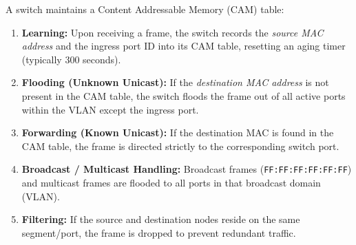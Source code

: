 \begin{keyconcept}
A switch maintains a Content Addressable Memory (CAM) table:
\begin{enumerate}[leftmargin=*]
    \item \textbf{Learning:} Upon receiving a frame, the switch records the \textit{source MAC address} and the ingress port ID into its CAM table, resetting an aging timer (typically 300 seconds).
    \item \textbf{Flooding (Unknown Unicast):} If the \textit{destination MAC address} is not present in the CAM table, the switch floods the frame out of all active ports within the VLAN except the ingress port.
    \item \textbf{Forwarding (Known Unicast):} If the destination MAC is found in the CAM table, the frame is directed strictly to the corresponding switch port.
    \item \textbf{Broadcast / Multicast Handling:} Broadcast frames (\texttt{FF:FF:FF:FF:FF:FF}) and multicast frames are flooded to all ports in that broadcast domain (VLAN).
    \item \textbf{Filtering:} If the source and destination nodes reside on the same segment/port, the frame is dropped to prevent redundant traffic.
\end{enumerate}
\end{keyconcept}

